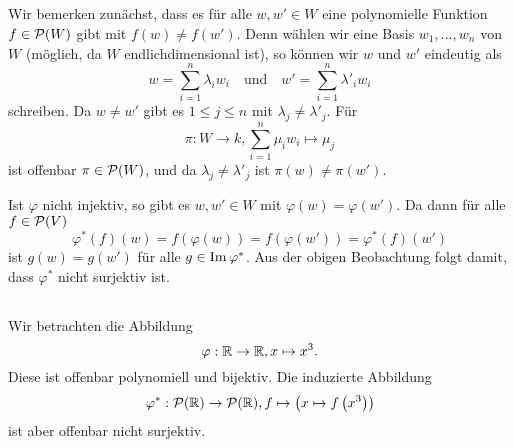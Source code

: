 \documentclass[a4paper,10pt]{article}
\begin{document}
\subsection{}
Wir bemerken zunächst, dass es für alle $w, w' \in W$ eine polynomielle Funktion $f \in \mathcal{P}(W)$ gibt mit $f(w) \neq f(w')$. Denn wählen wir eine Basis $w_1, \ldots, w_n$ von $W$ (möglich, da $W$ endlichdimensional ist), so können wir $w$ und $w'$ eindeutig als
\[
 w = \sum_{i=1}^n \lambda_i w_i \quad \text{und} \quad w' = \sum_{i=1}^n \lambda'_i w_i
\]
schreiben. Da $w \neq w'$ gibt es $1 \leq j \leq n$ mit $\lambda_j \neq \lambda'_j$. Für
\[
 \pi : W \to k, \sum_{i=1}^n \mu_i w_i \mapsto \mu_j
\]
ist offenbar $\pi \in \mathcal{P}(W)$, und da $\lambda_j \neq \lambda'_j$ ist $\pi(w) \neq \pi(w')$.

Ist $\varphi$ nicht injektiv, so gibt es $w, w' \in W$ mit $\varphi(w) = \varphi(w')$. Da dann für alle $f \in \mathcal{P}(V)$
\[
 \varphi^*(f)(w) = f(\varphi(w)) = f(\varphi(w')) = \varphi^*(f)(w')
\]
ist $g(w) = g(w')$ für alle $g \in \operatorname{Im} \varphi^*$. Aus der obigen Beobachtung folgt damit, dass $\varphi^*$ nicht surjektiv ist.


\subsection{}
Wir betrachten die Abbildung
\[
 \varphi : \mathbb{R} \to \mathbb{R}, x \mapsto x^3.
\]
Diese ist offenbar polynomiell und bijektiv. Die induzierte Abbildung
\[
 \varphi^* : \mathcal{P}(\mathbb{R}) \to \mathcal{P}(\mathbb{R}), f \mapsto \left( x \mapsto f\left(x^3\right) \right)
\]
ist aber offenbar nicht surjektiv.
\end{document}
